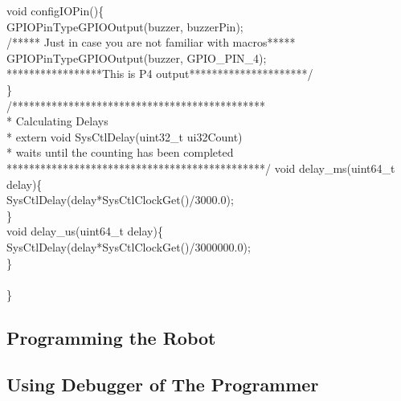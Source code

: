 \documentclass[a4paper,10pt,oneside]{article}
\begin{document}
			void configIOPin()\{\\
				GPIOPinTypeGPIOOutput(buzzer, buzzerPin);\\
				/***** Just in case you are not familiar with macros*****\\
				GPIOPinTypeGPIOOutput(buzzer, GPIO\_PIN\_4);\\
				*****************This is P4 output*********************/\\
			\}\\
			/*********************************************\\
			* Calculating Delays\\
			* extern void SysCtlDelay(uint32\_t ui32Count)\\
			* waits until the counting has been completed\\
			**********************************************/
			void delay\_ms(uint64\_t delay)\{\\
				SysCtlDelay(delay*SysCtlClockGet()/3000.0);\\
			\}\\
			void delay\_us(uint64\_t delay)\{\\
				SysCtlDelay(delay*SysCtlClockGet()/3000000.0);\\
			\}\\
			\\
		\}\\
		\subsection{\huge \textbf{Programming the Robot}}
		\subsection{\huge \textbf{Using Debugger of The Programmer}}
\end{document}
